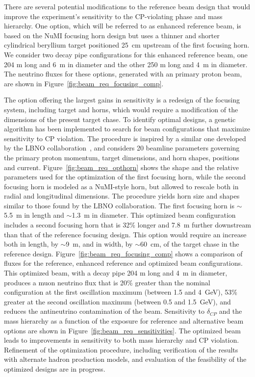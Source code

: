 There are several potential modifications to the reference beam design
that would improve the experiment's sensitivity to the CP-violating
phase and mass hierarchy.  One option, which will be referred to as enhanced
reference beam,  is based on the NuMI focusing horn design but uses a
thinner and shorter cylindrical beryllium target positioned 25~cm
upstream of the first focusing horn. We consider two decay pipe
configurations for this enhanced reference beam, one 204 m long and 6~m 
in diameter and the other 250 m long and 4~m in diameter.  The
neutrino fluxes for these options, generated with an  %
primary proton beam, are shown in Figure~\ref{fig:beam_req_focusing_comp}.
  
The option offering the largest gains in sensitivity is a redesign of
the focusing system, including target and horns, which would require a
modification of the dimensions of the present target chase.  To
identify optimal designs, a genetic algorithm has been implemented to
search for beam configurations that maximize sensitivity to CP
violation.  The procedure is inspired by a similar one developed by
the LBNO collaboration~\cite{Agarwalla:2014tca}, and considers 20
beamline parameters governing the primary proton momentum, target
dimensions, and horn shapes, positions and
current. Figure~\ref{fig:beam_req_opthorn} shows the shape and the
relative parameters  used for the optimization of the first focusing
horn, while the second focusing horn is modeled as a NuMI-style horn,
but allowed to rescale both in radial and longitudinal dimensions. The
procedure yields horn size and shapes similar to those found by the
LBNO collaboration. The first focusing horn is $\sim$5.5~m in length
and $\sim$1.3~m in diameter. This optimized beam configuration
includes a second focusing horn that is 32\% longer and 7.8~m further
downstream than that of the reference focusing design.  This option
would require an increase both in length, by $\sim$9~m, and in width,
by $\sim$60~cm, of the target chase in the reference design.
Figure~\ref{fig:beam_req_focusing_comp} shows a comparison of fluxes
for the reference, enhanced reference and optimized beam
configurations. This optimized beam, with a decay pipe 204 m long and
4~m in diameter, produces a muon neutrino flux that is 20\% greater
than the nominal configuration at the first oscillation maximum
(between 1.5 and 4~GeV), 53\% greater at the second oscillation
maximum (between 0.5 and 1.5~GeV), and reduces the antineutrino
contamination of the beam.  Sensitivity to $\delta_{CP}$ and the mass
hierarchy as a function of the exposure for reference and alternative
beam options are shown in Figure~\ref{fig:beam_req_sensitivities}.
The optimized beam leads to improvements in sensitivity to both mass
hierarchy and CP violation. Refinement of the optimization procedure,
including verification of the results with alternate hadron production
models, and evaluation of the feasibility of the optimized designs are
in progress.

